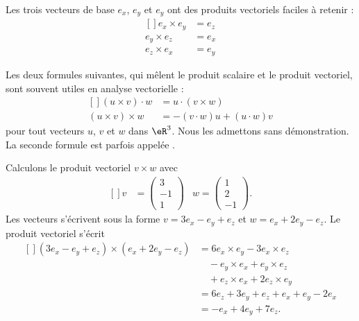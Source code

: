 Les trois vecteurs de base $e_x$, $e_y$ et $e_y$ ont des produits vectoriels faciles à retenir :
\begin{equation}
    \begin{aligned}[]
        e_x\times e_y & =e_z\\
        e_y\times e_z & =e_x\\
        e_z\times e_x & =e_y
    \end{aligned}
\end{equation}

Les deux formules suivantes, qui mêlent le produit scalaire et le produit vectoriel, sont souvent utiles en analyse vectorielle :
\begin{equation}
    \begin{aligned}[]
        (u\times v)\cdot w  & =u\cdot(v\times w)\\
        (u\times v)\times w & =-(v\cdot w)u+(u\cdot w)v     \label{EqFormExpluxxx}
    \end{aligned}
\end{equation}
pour tout vecteurs $u$, $v$ et $w$ dans $\eR^3$. Nous les admettons sans démonstration. La seconde formule est parfois appelée .

\begin{example}
    Calculons le produit vectoriel $v\times w$ avec
    \begin{equation}
        \begin{aligned}[]
            v&=\begin{pmatrix}
                3    \\
                -1    \\
                1
            \end{pmatrix}&w=\begin{pmatrix}
                1    \\
                2    \\
                -1
            \end{pmatrix}.
        \end{aligned}
    \end{equation}
    Les vecteurs s'écrivent sous la forme $v=3e_x-e_y+e_z$ et $w=e_x+2e_y-e_z$. Le produit vectoriel s'écrit
    \begin{equation}
        \begin{aligned}[]
            (3e_x-e_y+e_z)\times (e_x+2e_y-e_z)&=6e_x\times e_y-3e_x\times e_z\\
                                &\quad -e_y\times e_x + e_y\times e_z\\
                                &\quad + e_z\times e_x + 2e_z\times e_y\\
                                &=6e_z+3e_y+e_z+e_x+e_y-2e_x\\
                                &=-e_x+4e_y+7e_z.
        \end{aligned}
    \end{equation}
\end{example}

